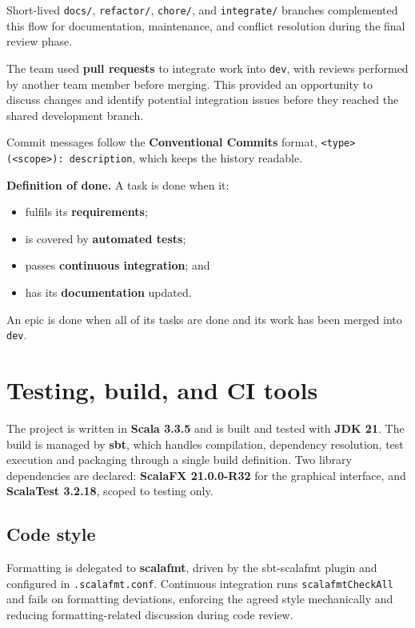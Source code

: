 Short-lived \texttt{docs/}, \texttt{refactor/}, \texttt{chore/}, and \texttt{integrate/} branches complemented this
flow for documentation, maintenance, and conflict resolution during the final review phase.

The team used \textbf{pull requests} to integrate work into \texttt{dev}, with reviews performed by another team member before
merging. This provided an opportunity to discuss changes and identify potential integration issues before they reached
the shared development branch.

Commit messages follow the \textbf{Conventional Commits} format, \texttt{<type>(<scope>): description}, which keeps the history
readable.

\textbf{Definition of done.} A task is done when it:

\begin{itemize}
  \item fulfils its \textbf{requirements};
  \item is covered by \textbf{automated tests};
  \item passes \textbf{continuous integration}; and
  \item has its \textbf{documentation} updated.
\end{itemize}

An epic is done when all of its tasks are done and its work has been merged into \texttt{dev}.

\section{Testing, build, and CI tools}

The project is written in \textbf{Scala 3.3.5} and is built and tested with \textbf{JDK 21}. The build is managed by \textbf{sbt}, which handles
compilation, dependency resolution, test execution and packaging through a single build definition. Two library dependencies
are declared: \textbf{ScalaFX 21.0.0-R32} for the graphical interface, and \textbf{ScalaTest 3.2.18}, scoped to testing only.

\subsection{Code style}

Formatting is delegated to \textbf{scalafmt}, driven by the sbt-scalafmt plugin and configured in \texttt{.scalafmt.conf}.
Continuous integration runs \texttt{scalafmtCheckAll} and fails on formatting deviations, enforcing the agreed style
mechanically and reducing formatting-related discussion during code review.


